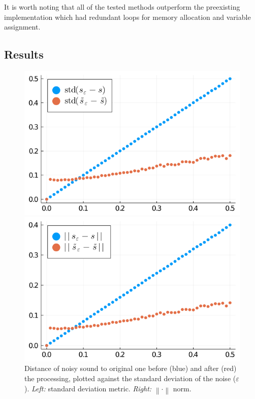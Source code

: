 \documentclass[
  american,
]{article}
\begin{document}
It is worth noting that all of the tested methods outperform
the preexisting implementation which had redundant loops
for memory allocation and variable assignment.

\hypertarget{results}{%
\subsection{Results}\label{results}}

\begin{figure}[H]
    \begin{minipage}{.47\linewidth}
    \centering
    \includegraphics[width=\textwidth]{img/std_diff.png}
    \end{minipage}%
    \hfill
    \begin{minipage}{.47\linewidth}
    \centering
    \includegraphics[width=\textwidth]{img/norm_diff.png}
    \end{minipage}
    \caption{\label{fig:experiments}Distance of noisy sound to original one before (blue) and after (red) the processing, plotted against the standard deviation of the noise ($\varepsilon$). \emph{Left:} standard deviation metric. \emph{Right:} $\left\lVert\cdot\right\rVert$ norm.}
\end{figure}
\end{document}

